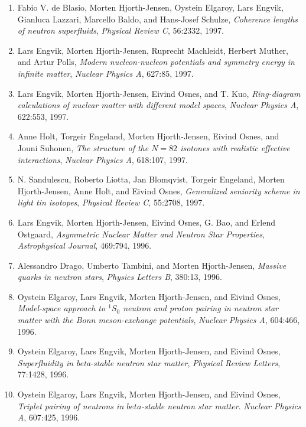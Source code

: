 \documentclass[%
oneside,                 %
final,                   %
10pt]{article}
\begin{document}
\begin{enumerate}
\item Fabio V. de Blasio, Morten Hjorth-Jensen, Oystein Elgaroy, Lars Engvik,   Gianluca Lazzari, Marcello Baldo, and Hans-Josef Schulze, \emph{Coherence lengths of neutron superfluids},  \emph{Physical Review C}, 56:2332, 1997. 

\item Lars Engvik, Morten Hjorth-Jensen, Ruprecht Machleidt, Herbert Muther, and   Artur Polls, \emph{Modern nucleon-nucleon potentials and symmetry energy in   infinite matter},  \emph{Nuclear Physics A}, 627:85, 1997. 

\item Lars Engvik, Morten Hjorth-Jensen, Eivind Osnes, and T. Kuo, \emph{Ring-diagram calculations of nuclear matter with different model   spaces},  \emph{Nuclear Physics A}, 622:553, 1997. 

\item Anne Holt, Torgeir Engeland, Morten Hjorth-Jensen, Eivind Osnes, and Jouni   Suhonen, \emph{The structure of the $N=82$ isotones with realistic effective   interactions},  \emph{Nuclear Physics A}, 618:107, 1997. 

\item N. Sandulescu, Roberto Liotta, Jan Blomqvist, Torgeir Engeland, Morten   Hjorth-Jensen, Anne Holt, and Eivind Osnes, \emph{Generalized seniority scheme in light tin isotopes},  \emph{Physical Review C}, 55:2708, 1997. 

\item Lars Engvik, Morten Hjorth-Jensen, Eivind Osnes, G. Bao, and Erlend Ostgaard, \emph{Asymmetric Nuclear Matter and Neutron Star Properties},  \emph{Astrophysical Journal}, 469:794, 1996. 

\item Alessandro Drago, Umberto Tambini, and Morten Hjorth-Jensen, \emph{Massive quarks in neutron stars},  \emph{Physics Letters B}, 380:13, 1996. 

\item Oystein Elgaroy, Lars Engvik, Morten Hjorth-Jensen, and Eivind Osnes,  \emph{Model-space approach to $^1S_0$ neutron and proton pairing in   neutron star matter with the Bonn meson-exchange potentials},  \emph{Nuclear Physics A}, 604:466, 1996. 

\item Oystein Elgaroy, Lars Engvik, Morten Hjorth-Jensen, and Eivind Osnes, \emph{Superfluidity in beta-stable neutron star matter},  \emph{Physical Review Letters}, 77:1428, 1996. 

\item Oystein Elgaroy, Lars Engvik, Morten Hjorth-Jensen, and Eivind Osnes, \emph{Triplet pairing of neutrons in $beta$-stable neutron star   matter}.  \emph{Nuclear Physics A}, 607:425, 1996. 


\end{enumerate}
\end{document}
